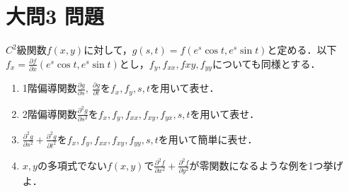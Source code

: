 \documentclass[dvipdfmx]{jsreport}
\begin{document}
\section{大問3 問題}
\begin{tcolorbox} %
	$C^2$級関数$f(x, y)$に対して，$g(s, t)= f(e^s \cos{t}, e^s \sin{t})$と定める．以下$f_x= \frac{\partial f}{\partial x}(e^s \cos{t}, e^s \sin{t})$とし，$f_y, f_{xx}, f{xy}, f_{yy}$についても同様とする．
\begin{enumerate}
	\item 1階偏導関数$\frac{\partial g}{\partial s},\ \frac{\partial g}{\partial t}$を$f_x, f_y, s, t$を用いて表せ．
	\item 2階偏導関数$\frac{\partial^2 g}{\partial s^2}$を$f_x, f_y, f_{xx}, f_{xy}, f_{yx}, s, t$を用いて表せ．
	\item $\frac{\partial^2 g}{\partial s^2}+ \frac{\partial^2 g}{\partial t^2}$を$f_x, f_y, f_{xx}, f_{xy}, f_{yy}, s, t$を用いて簡単に表せ．
	\item $x, y$の多項式でない$f(x, y)$で$\frac{\partial^2 f}{\partial x^2}+ \frac{\partial^2 f}{\partial y^2}$が零関数になるような例を1つ挙げよ．
\end{enumerate}
\end{tcolorbox}
\end{document}
